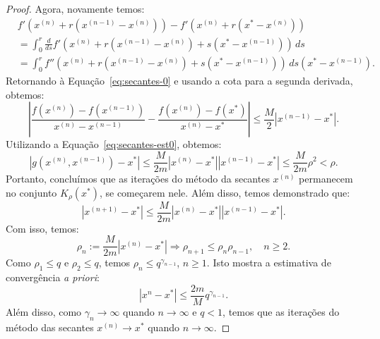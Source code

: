\begin{proof}
Agora, novamente temos:
\begin{equation*}
  \begin{split}
  &f'(x^{(n)} + r(x^{(n-1)} - x^{(n)})) - f'(x^{(n)} + r(x^* - x^{(n)}))\\
  &= \int_0^r \frac{d}{ds}f'(x^{(n)} + r(x^{(n-1)} - x^{(n)}) + s(x^* - x^{(n-1)}))\,ds\\
  &= \int_0^r f''(x^{(n)} + r(x^{(n-1)} - x^{(n)}) + s(x^* - x^{(n-1)}))\,ds(x^* - x^{(n-1)}).
  \end{split}
\end{equation*}
Retornando à Equação~\eqref{eq:secantes-0} e usando a cota para a segunda derivada, obtemos:
\begin{equation*}
  \left|\frac{f(x^{(n)}) - f(x^{(n-1)})}{x^{(n)} - x^{(n-1)}} - \frac{f(x^{(n)}) - f(x^*)}{x^{(n)} - x^*} \right| \leq \frac{M}{2}|x^{(n-1)} - x^*|.
\end{equation*}
Utilizando a Equação~\eqref{eq:secantes-est0}, obtemos:
\begin{equation*}
  |g(x^{(n)},x^{(n-1)})-x^*| \leq \frac{M}{2m}|x^{(n)}-x^*||x^{(n-1)}-x^*| \leq \frac{M}{2m}\rho^2 < \rho.
\end{equation*}
Portanto, concluímos que as iterações do método da secantes $x^{(n)}$ permanecem no conjunto $K_\rho(x^*)$, se começarem nele. Além disso, temos demonstrado que:
\begin{equation*}
  |x^{(n+1)} - x^*| \leq \frac{M}{2m}|x^{(n)} - x^*||x^{(n-1)} - x^*|.
\end{equation*}
Com isso, temos:
\begin{equation*}
  \rho_n := \frac{M}{2m}|x^{(n)} - x^*| \Rightarrow \rho_{n+1} \leq \rho_{n}\rho_{n-1},\quad n\geq 2.
\end{equation*}
Como $\rho_1 \leq q$ e $\rho_2 \leq q$, temos $\rho_n \leq q^{\gamma_{n-1}}$, $n\geq 1$. Isto mostra a estimativa de convergência \emph{a priori}:
\begin{equation*}
  |x^{n} - x^*| \leq \frac{2m}{M}q^{\gamma_{n-1}}.
\end{equation*}
Além disso, como $\gamma_{n}\to \infty$ quando $n\to\infty$ e $q < 1$, temos que as iterações do método das secantes $x^{(n)}\to x^*$ quando $n\to \infty$.


\end{proof}
